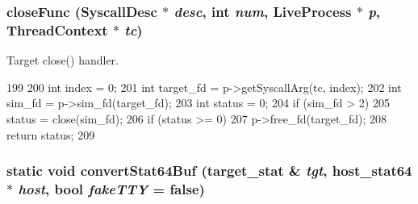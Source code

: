 \hypertarget{syscall__emul_8hh_a1cd0dfa0a5c6e64cc402c1a17fe6a86d}{
\subsubsection[{closeFunc}]{ closeFunc ({\bf SyscallDesc} $\ast$ {\em desc}, \/  int {\em num}, \/  {\bf LiveProcess} $\ast$ {\em p}, \/  {\bf ThreadContext} $\ast$ {\em tc})}}
\label{syscall__emul_8hh_a1cd0dfa0a5c6e64cc402c1a17fe6a86d}


Target close() handler. 


\begin{DoxyCode}
199 {
200     int index = 0;
201     int target_fd = p->getSyscallArg(tc, index);
202     int sim_fd = p->sim_fd(target_fd);
203     int status = 0;
204     if (sim_fd > 2)
205         status = close(sim_fd);
206     if (status >= 0)
207         p->free_fd(target_fd);
208     return status;
209 }
\end{DoxyCode}
\hypertarget{syscall__emul_8hh_a0bf9da6738473d5c324756b3259c57f4}{
\subsubsection[{convertStat64Buf}]{\setlength{\rightskip}{0pt plus 5cm}static void convertStat64Buf (target\_\-stat \& {\em tgt}, \/  host\_\-stat64 $\ast$ {\em host}, \/  bool {\em fakeTTY} = {\ttfamily false})}}
\label{syscall__emul_8hh_a0bf9da6738473d5c324756b3259c57f4}




